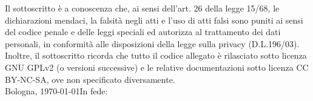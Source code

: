 \documentclass[11pt,a4paper]{moderncv}
\begin{document}

    

\vspace{\fill}
{\footnotesize\noindent
Il sottoscritto è a conoscenza che, ai sensi dell'art. 26 della legge 15/68, le dichiarazioni mendaci, la falsità negli atti e l'uso di atti falsi sono puniti ai sensi del codice penale e delle leggi speciali ed autorizza al trattamento dei dati personali, in conformità alle disposizioni della legge sulla privacy (D.L.196/03). Inoltre, il sottoscritto ricorda che tutto il codice allegato è rilasciato sotto licenza GNU GPLv2 (o versioni successive) e le relative documentazioni sotto licenza CC BY-NC-SA, ove non specificato diversamente.}
\vspace*{0.8cm}\\
Bologna, \today\hfill In fede: 
\end{document}
